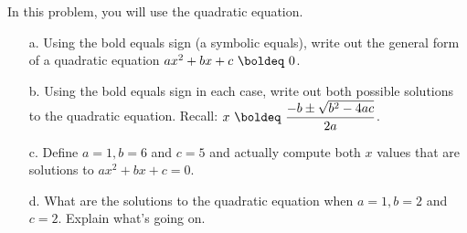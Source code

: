 {In this problem, you will use the quadratic equation.  
\begin{enumerate}
\item[a.] Using the bold equals sign (a symbolic equals), write out the general form of a quadratic equation $a x^2 + bx +c\ \boldeq \ 0$.
\item[b.] Using the bold equals sign in each case, write out both possible solutions to the quadratic equation. 
Recall: $x\ \boldeq \ \displaystyle \frac{-b \pm \sqrt{b^2-4ac}}{2a}$.
\item[c.] Define $a=1, b=6$ and $c=5$ and actually compute both $x$ values that are solutions to $a x^2 + bx +c = 0$.
\item[d.] What are the solutions to the quadratic equation when $a=1, b=2$ and $c=2$.  Explain what's going on.
\end{enumerate}
}
{}